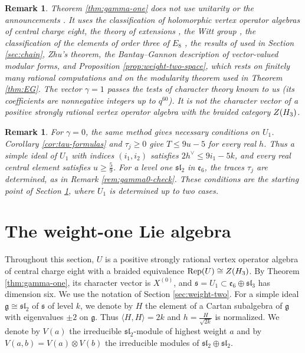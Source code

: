 \documentclass[leqno]{article}
\let\cal\relax
\newcommand{\cal}{\mathcal}
\renewcommand{\leq}{\ensuremath{\leqslant}}
\renewcommand{\geq}{\ensuremath{\geqslant}}
\newcommand{\ot}{\otimes}
\DeclareMathOperator{\Rep}{Rep}
\newtheorem{remark}[thm]{Remark}
\numberwithin{equation}{section}
\begin{document}
\begin{remark}\normalfont
\label{rem:gamma-one-hypotheses}
Theorem \ref{thm:gamma-one} does not use unitarity or the announcements \cite{Rie26,Hua26,Jia26}. It uses the classification of holomorphic vertex operator algebras of central charge eight, the theory of extensions \cite{HKL15,CKM22}, the Witt group \cite{DMNO13}, the classification of the elements of order three of $E_8$ \cite{Kac90}, the results of \cite{DoN99,DoM04,Mas14,ENO05} used in Section \ref{sec:chain}, Zhu's theorem, the Bantay--Gannon description of vector-valued modular forms, and Proposition \ref{prop:weight-two-space}, which rests on finitely many rational computations and on the modularity theorem used in Theorem \ref{thm:EG}. The vector $\gamma = 1$ passes the tests of character theory known to us (its coefficients are nonnegative integers up to $q^{60}$). It is not the character vector of a positive strongly rational vertex operator algebra with the braided category $Z(\cal H_3)$.
\end{remark}

\begin{remark}\normalfont
\label{rem:gamma-zero-constraints}
For $\gamma = 0$, the same method gives necessary conditions on $U_1$. Corollary \ref{cor:tau-formulas} and $\tau_j \geq 0$ give $T \leq 9u-5$ for every real $h$. Thus a simple ideal of $U_1$ with indices $(i_1,i_2)$ satisfies $2h^\vee \leq 9i_1-5k$, and every real central element satisfies $u \geq \frac59$. For a level one $\mathfrak{sl}_2$ in $\mathfrak e_6$, the traces $\tau_j$ are determined, as in Remark \ref{rem:gamma0-check}. These conditions are the starting point of Section \ref{sec:weight-one-lie}, where $U_1$ is determined up to two cases.
\end{remark}

\section{The weight-one Lie algebra}
\label{sec:weight-one-lie}

Throughout this section, $U$ is a positive strongly rational vertex operator algebra of central charge eight with a braided equivalence $\Rep(U) \cong Z(\cal H_3)$. By Theorem \ref{thm:gamma-one}, its character vector is $X^{(0)}$, and $\mathfrak s = U_1 \subset \mathfrak e_6 \oplus \mathfrak{sl}_3$ has dimension six. We use the notation of Section \ref{sec:weight-two}. For a simple ideal $\mathfrak g \cong \mathfrak{sl}_2$ of $\mathfrak s$ of level $k$, we denote by $H$ the element of a Cartan subalgebra of $\mathfrak g$ with eigenvalues $\pm 2$ on $\mathfrak g$. Thus $\langle H,H\rangle = 2k$ and $h = \frac{H}{\sqrt{2k}}$ is normalized. We denote by $V(a)$ the irreducible $\mathfrak{sl}_2$-module of highest weight $a$ and by $V(a,b) = V(a) \ot V(b)$ the irreducible modules of $\mathfrak{sl}_2 \oplus \mathfrak{sl}_2$.
\end{document}
